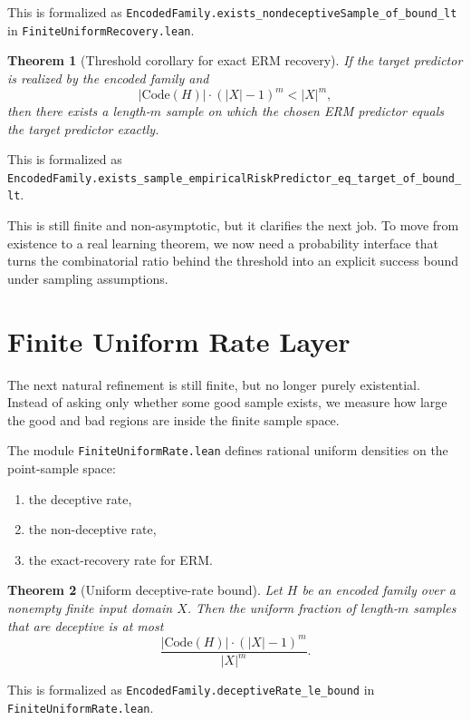 \documentclass[11pt]{article}
\newtheorem{theorem}{Theorem}[section]
\theoremstyle{remark}
\begin{document}
\noindent
This is formalized as
\texttt{EncodedFamily.exists\_nondeceptiveSample\_of\_bound\_lt} in
\texttt{FiniteUniformRecovery.lean}.

\begin{theorem}[Threshold corollary for exact ERM recovery]
If the target predictor is realized by the encoded family and
\[
  |\mathrm{Code}(H)| \cdot (|X|-1)^m < |X|^m,
\]
then there exists a length-\(m\) sample on which the chosen ERM predictor equals
the target predictor exactly.
\end{theorem}

\noindent
This is formalized as
\texttt{EncodedFamily.exists\_sample\_empiricalRiskPredictor\_eq\_target\_of\_bound\_lt}.

This is still finite and non-asymptotic, but it clarifies the next job.  To move
from existence to a real learning theorem, we now need a probability interface
that turns the combinatorial ratio behind the threshold into an explicit success
bound under sampling assumptions.

\section{Finite Uniform Rate Layer}

The next natural refinement is still finite, but no longer purely existential.
Instead of asking only whether some good sample exists, we measure how large the
good and bad regions are inside the finite sample space.

The module \texttt{FiniteUniformRate.lean} defines rational uniform densities on
the point-sample space:
\begin{enumerate}[leftmargin=1.5em]
  \item the deceptive rate,
  \item the non-deceptive rate,
  \item the exact-recovery rate for ERM.
\end{enumerate}

\begin{theorem}[Uniform deceptive-rate bound]
Let \(H\) be an encoded family over a nonempty finite input domain \(X\).  Then
the uniform fraction of length-\(m\) samples that are deceptive is at most
\[
  \frac{|\mathrm{Code}(H)| \cdot (|X|-1)^m}{|X|^m}.
\]
\end{theorem}

\noindent
This is formalized as
\texttt{EncodedFamily.deceptiveRate\_le\_bound} in
\texttt{FiniteUniformRate.lean}.
\end{document}
